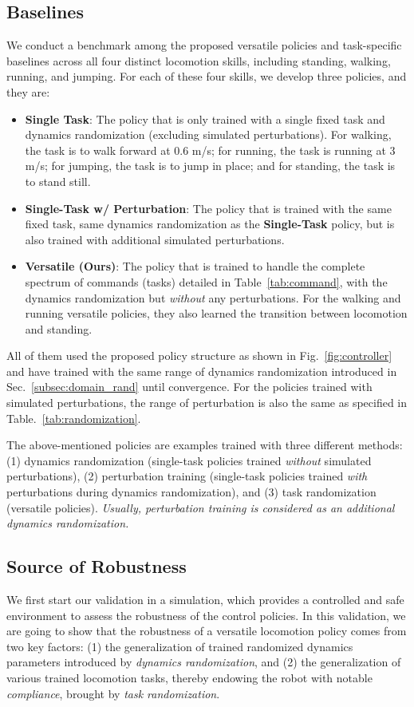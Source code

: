\subsection{Baselines}\label{subsec:multi_skill_baselines}
We conduct a benchmark among the proposed versatile policies and task-specific baselines across all four distinct locomotion skills, including standing, walking, running, and jumping. For each of these four skills, we develop three policies, and they are:
\begin{itemize}[leftmargin=9pt]
    \small
    \item \textbf{Single Task}: The policy that is only trained with a single fixed task and dynamics randomization (excluding simulated perturbations). For walking, the task is to walk forward at 0.6 m/s; for running, the task is running at 3 m/s; for jumping, the task is to jump in place; and for standing, the task is to stand still.
    \item \textbf{Single-Task w/ Perturbation}: The policy that is trained with the same fixed task, same dynamics randomization as the \textbf{Single-Task} policy, but is also trained with additional simulated perturbations.  
    \item \textbf{Versatile (Ours)}: The policy that is trained to handle the complete spectrum of commands (tasks) detailed in Table~\ref{tab:command}, with the dynamics randomization but \emph{without} any perturbations. For the walking and running versatile policies, they also learned the transition between locomotion and standing. 
\end{itemize}



All of them used the proposed policy structure as shown in Fig.~\ref{fig:controller} and have trained with the same range of dynamics randomization introduced in Sec.~\ref{subsec:domain_rand} until convergence. For the policies trained with simulated perturbations, the range of perturbation is also the same as specified in Table.~\ref{tab:randomization}.

The above-mentioned policies are examples trained with three different methods: (1) dynamics randomization (single-task policies trained \emph{without} simulated perturbations), (2) perturbation training (single-task policies trained \emph{with} perturbations during dynamics randomization), and (3) task randomization (versatile policies). \emph{Usually, perturbation training is considered as an additional dynamics randomization.}

\subsection{Source of Robustness}
We first start our validation in a simulation, which provides a controlled and safe environment to assess the robustness of the control policies. 
In this validation, we are going to show that the robustness of a versatile locomotion policy comes from two key factors: (1) the generalization of trained randomized dynamics parameters introduced by \emph{dynamics randomization}, and (2) the generalization of various trained locomotion tasks, thereby endowing the robot with notable \emph{compliance}, brought by \emph{task randomization}.

